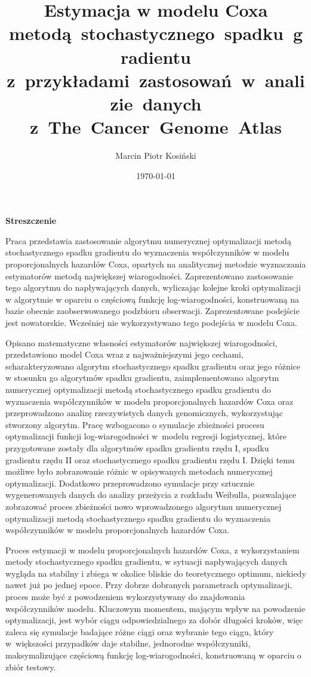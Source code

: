 \documentclass[]{mini}
\title{Estymacja w modelu Coxa metodą~stochastycznego~spadku~gradientu z~przykładami~zastosowań~w~analizie~danych z~The~Cancer~Genome~Atlas}
\author{Marcin Piotr Kosiński}
\date{\today}
\begin{document}
%
%


\maketitle

\begin{center}
\textbf{Streszczenie}
\end{center}

Praca przedstawia zastosowanie algorytmu numerycznej optymalizacji metodą stochastycznego spadku gradientu do wyznaczenia współczynników w modelu proporcjonalnych hazardów Coxa, opartych na analitycznej metodzie wyznaczania estymatorów metodą największej wiarogodności. Zaprezentowano zastosowanie tego algorytmu do napływających danych, wyliczając kolejne kroki optymalizacji w algorytmie w oparciu o częściową funkcję log-wiarogodności, konstruowaną na bazie obecnie zaobserwowanego podzbioru obserwacji. Zaprezentowane podejście jest nowatorskie. Wcześniej nie wykorzystywano tego podejścia w modelu Coxa.

Opisano matematyczne własności estymatorów największej wiarogodności, przedstawiono model Coxa wraz z najważniejszymi jego cechami, scharakteryzowano algorytm stochastycznego spadku gradientu oraz jego różnice w stosunku go algorytmów spadku gradientu, zaimplementowano algorytm numerycznej optymalizacji metodą stochastycznego spadku gradientu do wyznaczenia współczynników w modelu proporcjonalnych hazardów Coxa oraz przeprowadzono analizę rzeczywistych danych genomicznych, wykorzystując stworzony algorytm. Pracę wzbogacono o symulacje zbieżności procesu optymalizacji funkcji log-wiarogodności w~modelu regresji logistycznej, które przygotowane zostały dla algorytmów spadku gradientu rzędu I, spadku gradientu rzędu II oraz stochastycznego spadku gradientu rzędu I. Dzięki temu możliwe było zobrazowanie różnic w opisywanych metodach numerycznej optymalizacji. Dodatkowo przeprowadzono symulacje przy sztucznie wygenerowanych danych do analizy przeżycia z rozkładu Weibulla, pozwalające zobrazować proces zbieżności nowo wprowadzonego algorytmu numerycznej optymalizacji metodą stochastycznego spadku gradientu do wyznaczenia współczynników w modelu proporcjonalnych hazardów Coxa.

Proces estymacji w modelu proporcjonalnych hazardów Coxa, z wykorzystaniem metody stochastycznego spadku gradientu, w sytuacji napływających danych wygląda na stabilny i zbiega w okolice bliskie do teoretycznego optimum, niekiedy nawet już po jednej epoce. Przy dobrze dobranych parametrach optymalizacji, proces może być z powodzeniem wykorzystywany do znajdowania współczynników modelu. Kluczowym momentem, mającym wpływ na powodzenie optymalizacji, jest wybór ciągu odpowiedzialnego za dobór długości kroków, więc zaleca się symulacje badające różne ciągi oraz wybranie tego ciągu, który w~większości przypadków daje stabilne, jednorodne współczynniki, maksymalizujące częściową funkcję log-wiarogodności, konstruowaną w oparciu o zbiór testowy. 
\end{document}
